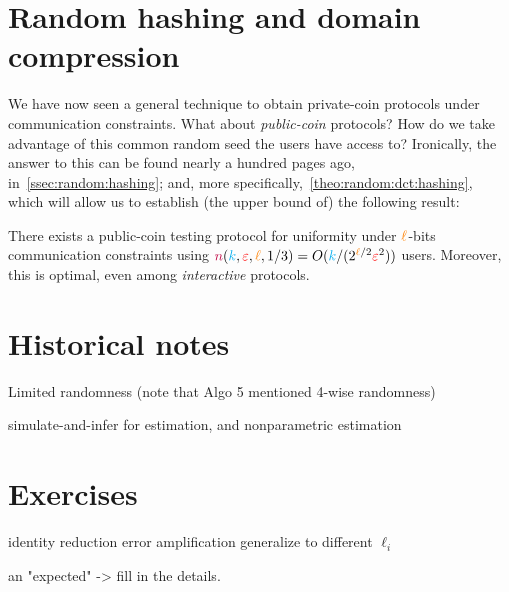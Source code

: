 \section{Random hashing and domain compression}
  \label{sec:domain:compression}
We have now seen a general technique to obtain private-coin protocols under communication constraints. What about \emph{public-coin} protocols? How do we take advantage of this common random seed the users have access to? Ironically, the answer to this can be found nearly a hundred pages ago, in~\cref{ssec:random:hashing}; and, more specifically,~\cref{theo:random:dct:hashing}, which will allow us to establish (the upper bound of) the following result:
\begin{theorem}
  \label{theo:public-coin}
There exists a public-coin testing protocol for uniformity under ${\textcolor{orange}{\ell}}$-bits communication constraints using ${\textcolor{purple}{n}}({\textcolor{cyan}{k}},\textcolor{red}{\varepsilon},{\textcolor{orange}{\ell}}, 1/3) = O({\textcolor{cyan}{k}}/(2^{{\textcolor{orange}{\ell}}/2} \textcolor{red}{\varepsilon}^2))$ users. Moreover, this is optimal, even among \emph{interactive} protocols.
\end{theorem}
\section{Historical notes}
  \label{sec:constrained:notes}
Limited randomness (note that Algo 5 mentioned 4-wise randomness)

simulate-and-infer for estimation, and nonparametric estimation
\section{Exercises}
identity reduction
error amplification
generalize to different $\ell_i$

an "expected" -> fill in the details.
